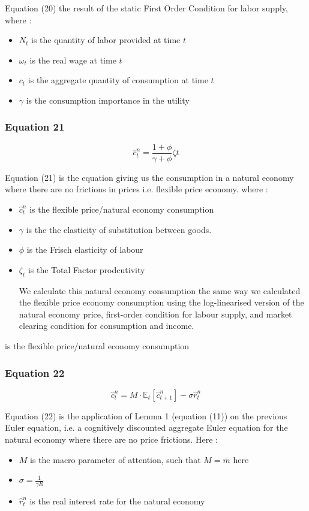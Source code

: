 \documentclass{article}
\begin{document}
Equation (20) the result of the static First Order Condition for labor supply, where : 
\begin{itemize}
    \item $N_{t}$ is the quantity of labor provided at time $t$
    \item $\omega_{t}$ is the real wage at time $t$
    \item $c_{t}$ is the aggregate quantity of consumption at time $t$
    \item $\gamma$ is the consumption importance in the utility
\end{itemize}

\subsubsection*{Equation 21}
\begin{equation}\tag{21}
    \hat{c}_{t}^{n}=\frac{1+\phi}{\gamma+\phi}\zeta{t}
\end{equation}

Equation (21) is the equation giving us the consumption in a natural economy where there are no frictions in prices i.e. flexible price economy. where :
\begin{itemize}
    \item $\hat{c}_{t}^{n}$ is the flexible price/natural economy consumption 
    \item $\gamma$ is the the elasticity of substitution between goods. 
    \item $\phi$ is the Frisch elasticity of labour
    \item $\zeta_{t}$ is the Total Factor prodcutivity

We calculate this natural economy consumption the same way we calculated the flexible price economy consumption using the log-linearised version of the natural economy price, first-order condition for labour supply, and market clearing condition for consumption and income. 
\end{itemize} is the flexible price/natural economy consumption

\subsubsection*{Equation 22}
\begin{equation}\tag{22}
    \hat{c}^{n}_{t} = M\cdot\mathbb{E}_{t}\left[\hat{c}^{n}_{t+1}\right]-\sigma\hat{r}^{n}_{t}
\end{equation}

Equation (22) is the application of Lemma 1 (equation (11)) on the previous Euler equation, i.e. a cognitively discounted aggregate Euler equation for the natural economy where there are no price frictions. Here : 
\begin{itemize}
    \item $M$ is the macro parameter of attention, such that $M=\bar{m}$ here
    \item $\sigma=\frac{1}{\gamma R}$ 
    \item $\hat r_{t}^{n}$ is the real interest rate for the natural economy
\end{itemize}
\end{document}
